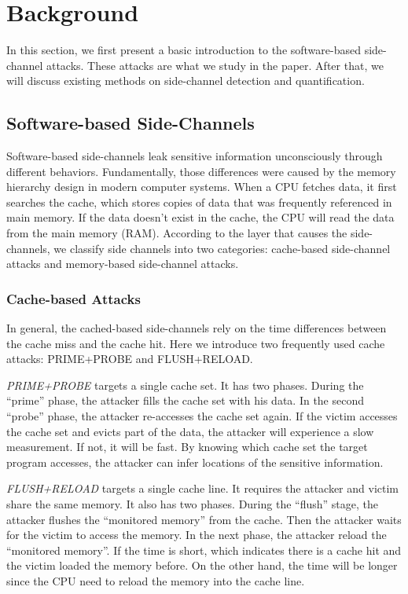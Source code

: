 \section{Background}
In this section, we first present a basic introduction to the 
software-based side-channel attacks. These attacks 
are what we study in the paper. After that, we 
will discuss existing methods on side-channel detection and quantification.

\subsection{Software-based Side-Channels}
Software-based side-channels %
leak sensitive information unconsciously through different 
behaviors. %
Fundamentally, those differences were caused by the memory hierarchy design 
in modern computer systems. When a CPU fetches data, it first searches
the cache, which stores copies of data that was 
frequently referenced in main memory. If the data doesn't exist in the cache, 
the CPU will read the data from the main memory (RAM). 
According to the layer that causes the side-channels, we classify
side channels into two categories: 
cache-based side-channel attacks and memory-based side-channel attacks.

\subsubsection{Cache-based Attacks}
In general, the cached-based side-channels rely on the time differences 
between the cache miss
and the cache hit. Here we introduce two frequently used cache attacks:
PRIME+PROBE and FLUSH+RELOAD.

\textit{PRIME+PROBE} targets a single cache set. It has two phases. During the
``prime'' phase, the attacker fills the cache set with his data.
In the second ``probe'' phase, the attacker re-accesses the cache set
again. If the victim accesses the cache set and evicts part of 
the data, the attacker will experience a slow measurement. If not, 
it will be fast. By knowing which cache set the target
program accesses, the attacker can infer locations of
the sensitive information.

\textit{FLUSH+RELOAD} targets a single cache line. 
It requires the attacker and victim share the same memory.
It also has two phases. During the ``flush'' stage, the attacker 
flushes the ``monitored memory'' from the cache. Then the attacker
waits for the victim to access the memory. In the next phase, the 
attacker reload the ``monitored memory''. If the time is short, which
indicates there is a cache hit and the victim loaded the memory before. 
On the other hand, the time will be longer since the CPU need to reload
the memory into the cache line. 

